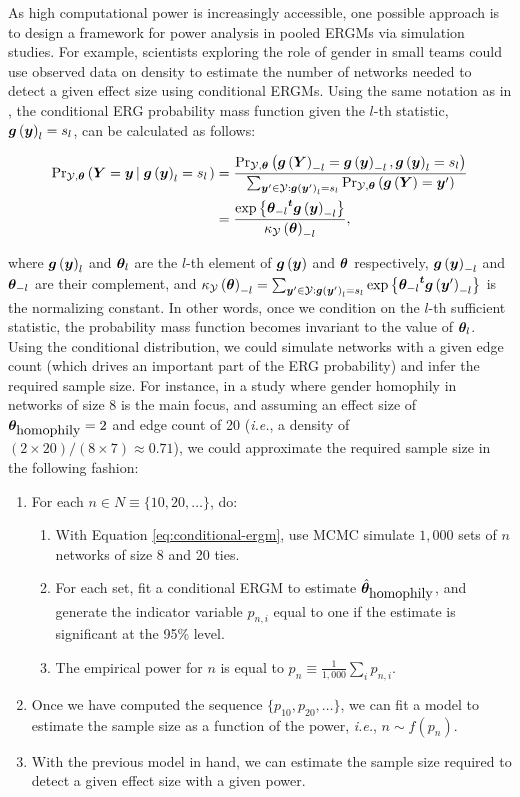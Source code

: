 \documentclass[12pt]{article}
\begin{document}
As high computational power is increasingly accessible, one possible approach is to design a framework for power analysis in pooled ERGMs via simulation studies. For example, scientists exploring the role of gender in small teams could use observed data on density to estimate the number of networks needed to detect a given effect size using conditional ERGMs.  Using the same notation as in \cite{krivitskyTaleTwoDatasets2022}, the conditional ERG probability mass function given the $l$-th statistic, $\bm{g}\left(\bm{y}\right)_l = s_l$, can be calculated as follows:

\begin{align}
\notag\Prcond{\Graph = \g}{\s{\g}_l = s_l}  & = \frac{%
	\Pr{\s{\Graph}_{-l} = \s{\g}_{-l}, \s{\g}_l = s_l}
}{%
	\sum_{\g'\in\GRAPH:\s{\g'}_l = s_l}\Pr{\s{\Graph} = \g'}%
} \\ & =  %
\frac{%
	\exp{\t{\coef_{-l}}\s{\g}_{-l}}
}{%
	\normconst_{-l}
}, \label{eq:conditional-ergm}
\end{align}


\noindent where $\bm{g}\left(\bm{y}\right)_l$ and $\bm{\theta}_l$ are the $l$-th element of $\bm{g}\left(\bm{y}\right)$ and $\bm{\theta}$ respectively, $\bm{g}\left(\bm{y}\right)_{-l}$ and $\bm{\theta}_{-l}$ are their complement, and $\kappa_{\mathcal{Y}}\left(\bm{\theta}\right)_{-l} = \sum_{\bm{y}' \in \mathcal{Y}: \bm{g}\left(\bm{y}'\right)_l = s_l}\mbox{exp}\left\{{\bm{\theta}_{-l}}^{\bm{t}}\bm{g}\left(\bm{y}'\right)_{-l}\right\}$ is the normalizing constant. In other words, once we condition on the $l$-th sufficient statistic, the probability mass function becomes invariant to the value of $\bm{\theta}_l$. Using the conditional distribution, we could simulate networks with a given edge count (which drives an important part of the ERG probability) and infer the required sample size. For instance, in a study where gender homophily in networks of size 8 is the main focus, and assuming an effect size of $\bm{\theta}_{\mbox{homophily}} = 2$ and edge count of 20 (\textit{i.e.}, a density of $(2\times 20)/(8 \times 7) \approx 0.71$), we could approximate the required sample size in the following fashion: 

\begin{enumerate}
  \item For each $n \in N \equiv \{10, 20, \dots\}$, do:
  \begin{enumerate}
    \item With Equation \eqref{eq:conditional-ergm}, use MCMC simulate $1,000$ sets of $n$ networks of size 8 and 20 ties.
    \item For each set, fit a conditional ERGM to estimate $\hat{\bm{\theta}}_{\mbox{homophily}}$, and generate the indicator variable $p_{n, i}$ equal to one if the estimate is significant at the 95\% level.
    \item The empirical power for $n$ is equal to $p_n \equiv \frac{1}{1,000}\sum_{i}p_{n, i}$.
  \end{enumerate}
  \item Once we have computed the sequence $\{p_{10}, p_{20}, \dots\}$, we can fit a model to estimate the sample size as a function of the power, \textit{i.e.}, $n \sim f(p_n)$.
  \item With the previous model in hand, we can estimate the sample size required to detect a given effect size with a given power.
\end{enumerate}
\end{document}
